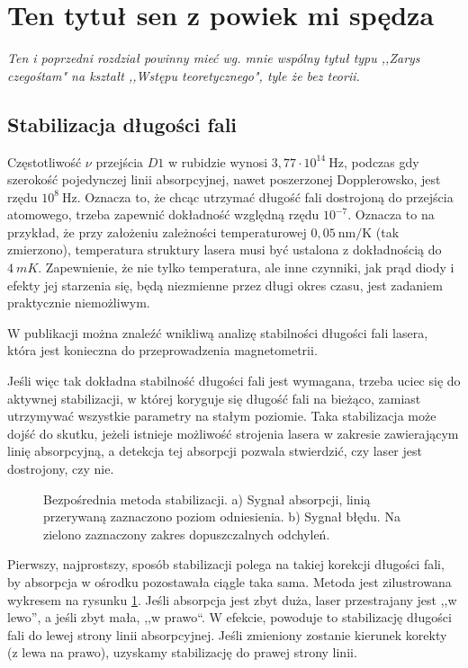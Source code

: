 \documentclass[a4paper,10pt]{article}
\begin{document}
\section{Ten tytuł sen z powiek mi spędza}

\emph{Ten i poprzedni rozdział powinny mieć wg. mnie wspólny tytuł typu ,,Zarys czegośtam" na kształt ,,Wstępu teoretycznego", tyle że bez teorii.}

\subsection{Stabilizacja długości fali}

Częstotliwość $\nu$ przejścia $D1$ w rubidzie wynosi $3{,}77 \cdot 10^{14}~
\mathrm{Hz}$, podczas gdy szerokość pojedynczej linii absorpcyjnej,
nawet poszerzonej Dopplerowsko, jest rzędu $10^8~\mathrm{Hz}$. Oznacza to, że 
chcąc utrzymać długość fali dostrojoną do przejścia atomowego,
trzeba zapewnić dokładność względną rzędu $10^{-7}$. Oznacza to na przykład, że przy założeniu zależności temperaturowej $0{,}05 ~\mathrm{nm/K}$ (tak zmierzono), temperatura struktury lasera musi być ustalona z dokładnością do $4~mK$. Zapewnienie,
że nie tylko temperatura, ale inne czynniki, jak prąd diody i efekty jej 
starzenia się, będą niezmienne przez długi okres czasu, jest zadaniem 
praktycznie niemożliwym.

W publikacji \cite{sensitivity} można znaleźć wnikliwą analizę stabilności długości fali lasera, która jest konieczna do przeprowadzenia magnetometrii. 

Jeśli więc tak dokładna stabilność długości fali jest wymagana, trzeba uciec się do aktywnej 
stabilizacji, w której koryguje się długość fali na bieżąco, zamiast utrzymywać 
wszystkie parametry na stałym poziomie.
Taka stabilizacja może dojść do skutku, jeżeli istnieje możliwość strojenia 
lasera w zakresie zawierającym linię absorpcyjną, a detekcja tej absorpcji pozwala stwierdzić, czy laser jest dostrojony, czy nie.

\begin{figure}
\caption{Bezpośrednia metoda stabilizacji. a) Sygnał absorpcji, linią przerywaną zaznaczono poziom odniesienia. b) Sygnał błędu. Na zielono zaznaczony zakres dopuszczalnych odchyleń.}
\label{fig:lock1}
\end{figure} 


Pierwszy, najprostszy, sposób stabilizacji polega na takiej korekcji długości 
fali, by absorpcja w ośrodku pozostawała ciągle taka sama.
Metoda jest zilustrowana wykresem na rysunku \ref{fig:lock1}. Jeśli absorpcja 
jest zbyt duża, laser przestrajany jest ,,w lewo'', a jeśli zbyt mała, ,,w 
prawo``.
W efekcie, powoduje to stabilizację długości fali do lewej strony linii absorpcyjnej.
Jeśli zmieniony zostanie kierunek korekty (z lewa na prawo), uzyskamy stabilizację do prawej strony linii.
\end{document}
